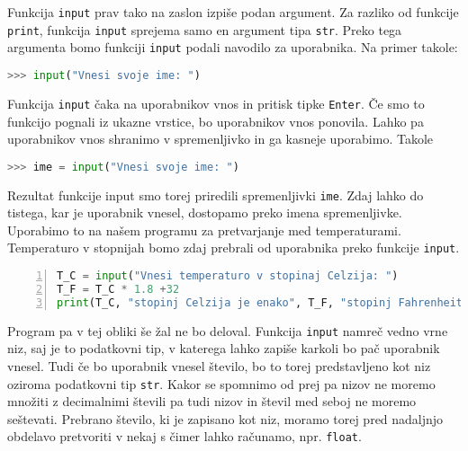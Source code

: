 Funkcija \texttt{input} prav tako na zaslon izpiše podan argument. Za razliko od funkcije \texttt{print}, funkcija \texttt{input} sprejema samo en argument tipa \texttt{str}. Preko tega argumenta bomo funkciji \texttt{input} podali navodilo za uporabnika. Na primer takole:
\begin{lstlisting}[language=Python]
>>> input("Vnesi svoje ime: ")
\end{lstlisting}
Funkcija \texttt{input} čaka na uporabnikov vnos in pritisk tipke \texttt{Enter}. Če smo to funkcijo pognali iz ukazne vrstice, bo uporabnikov vnos ponovila. Lahko pa uporabnikov vnos shranimo v spremenljivko in ga kasneje uporabimo. Takole
\begin{lstlisting}[language=Python]
>>> ime = input("Vnesi svoje ime: ")
\end{lstlisting}
Rezultat funkcije input smo torej priredili spremenljivki \texttt{ime}. Zdaj lahko do tistega, kar je uporabnik vnesel, dostopamo preko imena spremenljivke. Uporabimo to na našem programu za pretvarjanje med temperaturami. Temperaturo v stopnijah bomo zdaj prebrali od uporabnika preko funkcije \texttt{input}.
\begin{lstlisting}[language=Python,numbers=left]
T_C = input("Vnesi temperaturo v stopinaj Celzija: ")
T_F = T_C * 1.8 +32
print(T_C, "stopinj Celzija je enako", T_F, "stopinj Fahrenheit.")
\end{lstlisting}
Program pa v tej obliki še žal ne bo deloval. Funkcija \texttt{input} namreč vedno vrne niz, saj je to podatkovni tip, v katerega lahko zapiše karkoli bo pač uporabnik vnesel. Tudi če bo uporabnik vnesel število, bo to torej predstavljeno kot niz oziroma podatkovni tip \texttt{str}. Kakor se spomnimo od prej pa nizov ne moremo množiti z decimalnimi števili pa tudi nizov in števil med seboj ne moremo seštevati. Prebrano število, ki je zapisano kot niz, moramo torej pred nadaljnjo obdelavo pretvoriti v nekaj s čimer lahko računamo, npr. \texttt{float}. 

